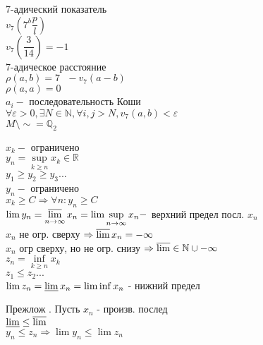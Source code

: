 
7-адический показатель \\
$ v_7\left( 7^b \dfrac{p}{l} \right) $ \\
$ v_7 \left( \dfrac{3}{14} \right)  = -1 $ \\
7-адическое расстояние \\
$ \rho (a, b) = 7  \ \ \ -v_7(a - b) $ \\
$ \rho (a, a) = 0 $ \\
$ a_i - $ последовательность Коши \\
$ \forall \varepsilon > 0, \exists N \in \mathbb{N}, \forall i,j > N, v_7(a, b) < \varepsilon$ \\
$ M \setminus \sim = \mathbb{Q}_2 $ \\

\begin{definition}
$ x_k - $ ограничено \\
$ y_n = \sup\limits_{k \geq n} x_k \in \mathbb{R} $ \\
$ y_1 \geq y_2 \geq y_3 ...$\\
$ y_n - $ ограничено \\
$ x_k \geq C \Rightarrow \forall n : y_n \geq C $ \\
$ \lim y_n = \varlimsup\limits_{n \rightarrow \infty} x_n = \lim\sup\limits_{n \rightarrow \infty} x_n  - $ верхний предел посл. $ x_n $ \\
$ x_n $ не огр. сверху $ \Rightarrow \varlimsup x_n = -\infty $\\
$ x_n $ огр сверху, но не огр. снизу $ \Rightarrow \varlimsup \in \mathbb{N} \cup -\infty $ \\
$ z_n = \inf\limits_{k \geq n} x_k $ \\
$ z_1 \leq z_2 ... $\\
$ \lim z_n = \varliminf x_n = \lim\inf x_n $ - нижний предел 
\end{definition}
Прежлож . Пусть $x_n$ - произв. послед \\
$ \varliminf \leq \varlimsup $\\
$ y_n \leq z_n \Rightarrow \lim y_n \leq \lim z_n $ \\

